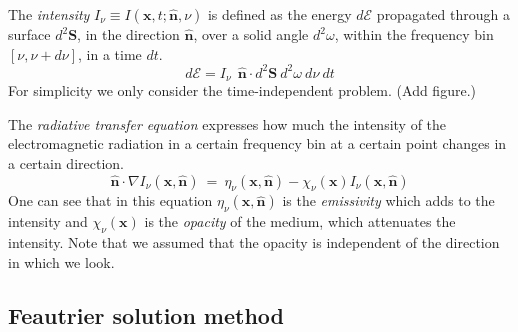 \documentclass[]{article}
\begin{document}
The \emph{intensity} $I_{\nu}\equiv I( \textbf{x},t;\hat{\textbf{n}},\nu)$ is defined as the energy $d\mathcal{E}$ propagated through a surface $d^{2}\textbf{S}$, in the direction $\hat{\textbf{n}}$, over a solid angle $d^{2}\omega$, within the frequency bin $[\nu,\nu+d\nu]$, in a time $dt$.
\begin{equation}
	d\mathcal{E} = I_{\nu} \ \ \hat{\textbf{n}} \cdot d^{2}\textbf{S} \ d^{2}\omega \ d\nu \ dt
\end{equation}
For simplicity we only consider the time-independent problem. (Add figure.)

\bigskip

The \emph{radiative transfer equation} expresses how much the intensity of the electromagnetic radiation in a certain frequency bin at a certain point changes in a certain direction.
\begin{equation}
\hat{\textbf{n}} \cdot \nabla I_{\nu}(\textbf{x},\hat{\textbf{n}}) \ = \ \eta_{\nu}(\textbf{x},\hat{\textbf{n}}) - \chi_{\nu}(\textbf{x}) I_{\nu}(\textbf{x},\hat{\textbf{n}})
\end{equation}
One can see that in this equation $\eta_{\nu}(\textbf{x},\hat{\textbf{n}})$ is the \emph{emissivity} which adds to the intensity and $\chi_{\nu}(\textbf{x})$ is the \emph{opacity} of the medium, which attenuates the intensity. Note that we assumed that the opacity is independent of the direction in which we look.


\subsection{Feautrier solution method}
\end{document}
